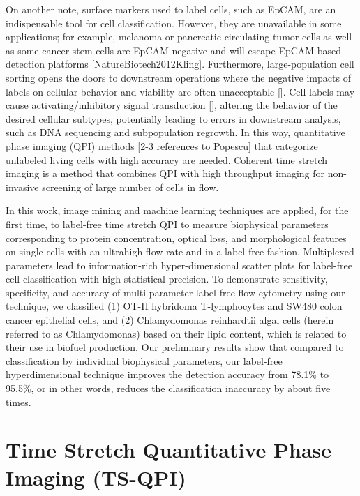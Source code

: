\documentclass[aps,pra,reprint,superscriptaddress]{revtex4-1}
\begin{document}
On another note, surface markers used to label cells, such as EpCAM, are an indispensable tool for cell classification. However, they are unavailable in some applications; for example, melanoma or pancreatic circulating tumor cells as well as some cancer stem cells are EpCAM-negative and will escape EpCAM-based detection platforms [NatureBiotech2012Kling]. Furthermore, large-population cell sorting opens the doors to downstream operations where the negative impacts of labels on cellular behavior and viability are often unacceptable []. Cell labels may cause activating/inhibitory signal transduction [], altering the behavior of the desired cellular subtypes, potentially leading to errors in downstream analysis, such as DNA sequencing and subpopulation regrowth. In this way, quantitative phase imaging (QPI) methods [2-3 references to Popescu] that categorize unlabeled living cells with high accuracy are needed. Coherent time stretch imaging is a method that combines QPI with high throughput imaging for non-invasive screening of large number of cells in flow.

In this work, image mining and machine learning techniques are applied, for the first time, to label-free time stretch QPI to measure biophysical parameters corresponding to protein concentration, optical loss, and morphological features on single cells with an ultrahigh flow rate and in a label-free fashion. Multiplexed parameters lead to information-rich hyper-dimensional scatter plots for label-free cell classification with high statistical precision. To demonstrate sensitivity, specificity, and accuracy of multi-parameter label-free flow cytometry using our technique, we classified (1) OT-II hybridoma T-lymphocytes and SW480 colon cancer epithelial cells, and (2) Chlamydomonas reinhardtii algal cells (herein referred to as Chlamydomonas) based on their lipid content, which is related to their use in biofuel production. Our preliminary results show that compared to classification by individual biophysical parameters, our label-free hyperdimensional technique improves the detection accuracy from 78.1\% to 95.5\%, or in other words, reduces the classification inaccuracy by about five times. 

\section{Time Stretch Quantitative Phase Imaging (TS-QPI)}
\end{document}
